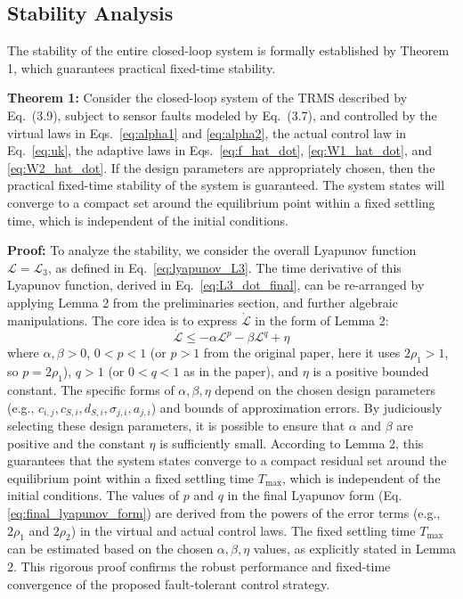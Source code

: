 \subsection{Stability Analysis}
\label{sec:stability_analysis_trms}

The stability of the entire closed-loop system is formally established by Theorem 1, which guarantees practical fixed-time stability.

\textbf{Theorem 1:} Consider the closed-loop system of the TRMS described by Eq.~(3.9), subject to sensor faults modeled by Eq.~(3.7), and controlled by the virtual laws in Eqs.~\eqref{eq:alpha1} and \eqref{eq:alpha2}, the actual control law in Eq.~\eqref{eq:uk}, the adaptive laws in Eqs.~\eqref{eq:f_hat_dot}, \eqref{eq:W1_hat_dot}, and \eqref{eq:W2_hat_dot}. If the design parameters are appropriately chosen, then the practical fixed-time stability of the system is guaranteed. The system states will converge to a compact set around the equilibrium point within a fixed settling time, which is independent of the initial conditions.

\textbf{Proof:}
To analyze the stability, we consider the overall Lyapunov function $\mathcal{L} = \mathcal{L}_3$, as defined in Eq.~\eqref{eq:lyapunov_L3}. The time derivative of this Lyapunov function, derived in Eq.~\eqref{eq:L3_dot_final}, can be re-arranged by applying Lemma 2 from the preliminaries section, and further algebraic manipulations. The core idea is to express $\dot{\mathcal{L}}$ in the form of Lemma 2:
\begin{equation}
    \dot{\mathcal{L}} \le -\alpha \mathcal{L}^p - \beta \mathcal{L}^q + \eta \label{eq:final_lyapunov_form}
\end{equation}
where $\alpha, \beta > 0$, $0 < p < 1$ (or $p > 1$ from the original paper, here it uses $2\rho_1 > 1$, so $p=2\rho_1$), $q > 1$ (or $0<q<1$ as in the paper), and $\eta$ is a positive bounded constant. The specific forms of $\alpha, \beta, \eta$ depend on the chosen design parameters (e.g., $c_{i,j}, c_{S,i}, d_{S,i}, \sigma_{j,i}, a_{j,i}$) and bounds of approximation errors.
By judiciously selecting these design parameters, it is possible to ensure that $\alpha$ and $\beta$ are positive and the constant $\eta$ is sufficiently small. According to Lemma 2, this guarantees that the system states converge to a compact residual set around the equilibrium point within a fixed settling time $T_{\max}$, which is independent of the initial conditions. The values of $p$ and $q$ in the final Lyapunov form (Eq. \eqref{eq:final_lyapunov_form}) are derived from the powers of the error terms (e.g., $2\rho_1$ and $2\rho_2$) in the virtual and actual control laws. The fixed settling time $T_{\max}$ can be estimated based on the chosen $\alpha, \beta, \eta$ values, as explicitly stated in Lemma 2. This rigorous proof confirms the robust performance and fixed-time convergence of the proposed fault-tolerant control strategy.

